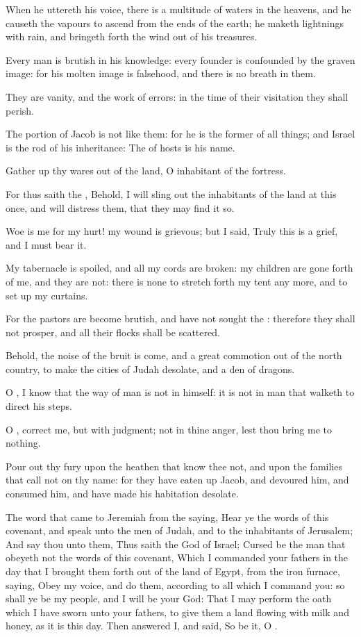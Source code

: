 \Verse When he uttereth his voice, there is a multitude of waters in the heavens, and he causeth the vapours to ascend from the ends of the earth; he maketh lightnings with rain, and bringeth forth the wind out of his treasures.

\Verse Every man is brutish in his knowledge: every founder is confounded by the graven image: for his molten image is falsehood, and there is no breath in them.

\Verse They are vanity, and the work of errors: in the time of their visitation they shall perish.

\Verse The portion of Jacob is not like them: for he is the former of all things; and Israel is the rod of his inheritance: The \LORD of hosts is his name.

\Verse Gather up thy wares out of the land, O inhabitant of the fortress.

\Verse For thus saith the \LORD, Behold, I will sling out the inhabitants of the land at this once, and will distress them, that they may find it so.

\Verse Woe is me for my hurt! my wound is grievous; but I said, Truly this is a grief, and I must bear it.

\Verse My tabernacle is spoiled, and all my cords are broken: my children are gone forth of me, and they are not: there is none to stretch forth my tent any more, and to set up my curtains.

\Verse For the pastors are become brutish, and have not sought the \LORD: therefore they shall not prosper, and all their flocks shall be scattered.

\Verse Behold, the noise of the bruit is come, and a great commotion out of the north country, to make the cities of Judah desolate, and a den of dragons.

\Verse O \LORD, I know that the way of man is not in himself: it is not in man that walketh to direct his steps.

\Verse O \LORD, correct me, but with judgment; not in thine anger, lest thou bring me to nothing.

\Verse Pour out thy fury upon the heathen that know thee not, and upon the families that call not on thy name: for they have eaten up Jacob, and devoured him, and consumed him, and have made his habitation desolate.


\Chapter
\Verse The word that came to Jeremiah from the \LORD saying, \Verse Hear ye the words of this covenant, and speak unto the men of Judah, and to the inhabitants of Jerusalem; \Verse And say thou unto them, Thus saith the \LORD God of Israel; Cursed be the man that obeyeth not the words of this covenant, \Verse Which I commanded your fathers in the day that I brought them forth out of the land of Egypt, from the iron furnace, saying, Obey my voice, and do them, according to all which I command you: so shall ye be my people, and I will be your God: \Verse That I may perform the oath which I have sworn unto your fathers, to give them a land flowing with milk and honey, as it is this day. Then answered I, and said, So be it, O \LORD.


